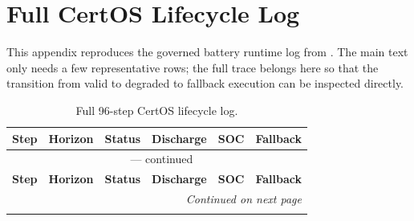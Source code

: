 \chapter{Full CertOS Lifecycle Log}
\label{app:certos-lifecycle-log}

This appendix reproduces the governed battery runtime log from
.  The main text only needs a few
representative rows; the full trace belongs here so that the transition from
valid to degraded to fallback execution can be inspected directly.

\begin{small}
\begin{longtable}{@{}rrrrrl@{}}
\caption{Full 96-step CertOS lifecycle log.}
\label{tab:certos-full-log} \\
\toprule
\textbf{Step} & \textbf{Horizon} & \textbf{Status} & \textbf{Discharge} &
\textbf{SOC} & \textbf{Fallback} \\
\midrule
\endfirsthead

\multicolumn{6}{c}{\tablename\ \thetable{} --- continued} \\
\toprule
\textbf{Step} & \textbf{Horizon} & \textbf{Status} & \textbf{Discharge} &
\textbf{SOC} & \textbf{Fallback} \\
\midrule
\endhead

\midrule
\multicolumn{6}{r}{\textit{Continued on next page}} \\
\endfoot

\bottomrule
\endlastfoot


\end{longtable}
\end{small}
